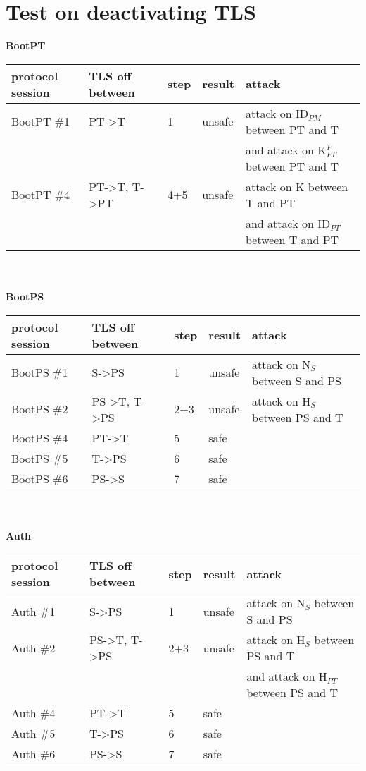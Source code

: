 \chapter{Test on deactivating TLS}

\textbf{BootPT}\\
\begin{tabular}[h]{| l | l | l | l | l |}
\hline
protocol session & TLS off between & step & result & attack \\ \hline
BootPT \#1       & PT->T           & 1    & unsafe & attack on ID$_{PM}$ between PT and T \\
& & &                                     & and attack on K$^P_{PT}$ between PT and T\\ \hline
BootPT \#4       & PT->T, T->PT    & 4+5  & unsafe & attack on K between T and PT \\
& & &                                     & and attack on ID$_{PT}$ between T and PT \\ \hline
\end{tabular}
\\ \\
\textbf{BootPS}\\
\begin{tabular}[h]{| l | l | l | l | l |}
\hline
protocol session & TLS off between & step & result & attack \\ \hline
BootPS \#1       & S->PS           & 1    & unsafe & attack on N$_S$ between S and PS \\ \hline
BootPS \#2       & PS->T, T->PS    & 2+3  & unsafe & attack on H$_S$ between PS and T \\ \hline
BootPS \#4       & PT->T           & 5    & safe   & \\ \hline
BootPS \#5       & T->PS           & 6    & safe   & \\ \hline
BootPS \#6       & PS->S           & 7    & safe   & \\ \hline
\end{tabular}
\\ \\
\textbf{Auth}\\
\begin{tabular}[h]{| l | l | l | l | l |}
\hline
protocol session & TLS off between & step & result & attack \\ \hline
Auth \#1         & S->PS           & 1    & unsafe & attack on N$_S$ between S and PS \\ \hline
Auth \#2         & PS->T, T->PS    & 2+3  & unsafe & attack on H$_S$ between PS and T \\
& & &                                              & and attack on H$_{PT}$ between PS and T \\ \hline
Auth \#4         & PT->T           & 5    & safe   & \\ \hline
Auth \#5         & T->PS           & 6    & safe   & \\ \hline
Auth \#6         & PS->S           & 7    & safe   & \\ \hline
\end{tabular}
